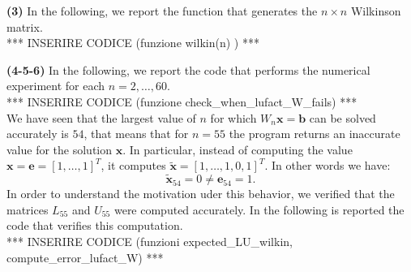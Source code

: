 \documentclass[a4paper]{report}
\numberwithin{equation}{chapter}
\begin{document}
	
\noindent \textbf{(3)} In the following, we report the function that generates the $n \times n $ Wilkinson matrix.\\
*** INSERIRE CODICE (funzione wilkin(n) ) ***\\


\noindent 

\noindent \textbf{(4-5-6)} In the following, we report the code that performs the numerical experiment for each $n=2,\dots,60$.\\

*** INSERIRE CODICE (funzione check\_when\_lufact\_W\_fails) ***\\


\noindent We have seen that the largest value of $n$ for which $W_n \textbf{x} = \textbf{b}$ can be solved accurately is $54$, that means that for $n=55$ the program returns an inaccurate value for the solution $\textbf{x}$. In particular, instead of computing the value $\textbf{x} = \textbf{e} = [1,\dots,1]^T$, it computes $\tilde{\textbf{x}} = [1,\dots,1,0,1]^T$. In other words we have:
\begin{equation}\label{key}
	\tilde{\textbf{x}}_{54} = 0 \neq \textbf{e}_{54} = 1.
\end{equation}
In order to understand the motivation uder this behavior, we verified that the matrices $L_{55}$ and $U_{55}$ were computed accurately. In the following is reported the code that verifies this computation.\\

*** INSERIRE CODICE (funzioni expected\_LU\_wilkin, compute\_error\_lufact\_W) ***\\
\end{document}
